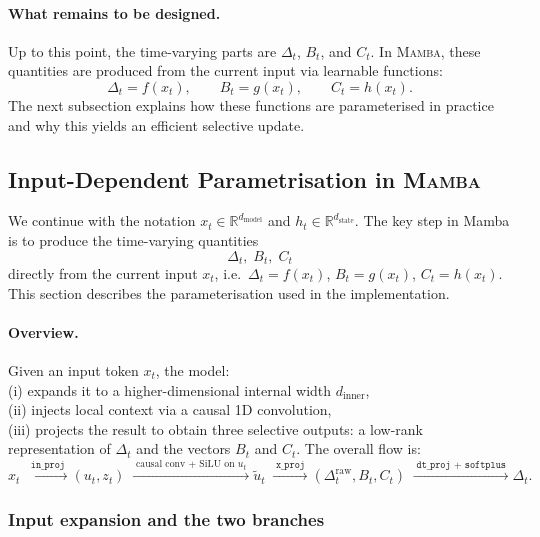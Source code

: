 \documentclass[a4paper,11pt]{article}
\begin{document}
\paragraph{What remains to be designed.}
Up to this point, the time-varying parts are $\Delta_t$, $B_t$, and $C_t$.
In \textsc{Mamba}, these quantities are produced from the current input via learnable functions:
\begin{equation}
    \Delta_t = f(x_t), \qquad B_t = g(x_t), \qquad C_t = h(x_t).
\end{equation}
The next subsection explains how these functions are parameterised in practice and why this yields an efficient selective update.




\subsection{Input-Dependent Parametrisation in \textsc{Mamba}}
\label{app:mamba-param}

We continue with the notation $x_t \in \mathbb{R}^{d_{\text{model}}}$ and $h_t \in \mathbb{R}^{d_{\text{state}}}$. 
The key step in Mamba is to produce the time-varying quantities
\[
\Delta_t,\; B_t,\; C_t
\]
directly from the current input $x_t$, i.e.\ $\Delta_t=f(x_t)$, $B_t=g(x_t)$, $C_t=h(x_t)$. 
This section describes the parameterisation used in the implementation.

\paragraph{Overview.}
Given an input token $x_t$, the model:\\
(i) expands it to a higher-dimensional internal width $d_{\text{inner}}$,\\
(ii) injects local context via a causal 1D convolution,\\
(iii) projects the result to obtain three selective outputs: a low-rank representation of $\Delta_t$ and the vectors $B_t$ and $C_t$.
The overall flow is:
\[
x_t 
\;\xrightarrow{\;\texttt{in\_proj}\;}
(u_t, z_t)
\;\xrightarrow{\;\text{causal conv + SiLU on }u_t\;}
\tilde{u}_t
\;\xrightarrow{\;\texttt{x\_proj}\;}
(\Delta^{\text{raw}}_t, B_t, C_t)
\;\xrightarrow{\;\texttt{dt\_proj + softplus}\;}
\Delta_t.
\]

\subsubsection{Input expansion and the two branches}
\label{app:mamba-inproj}
\end{document}
